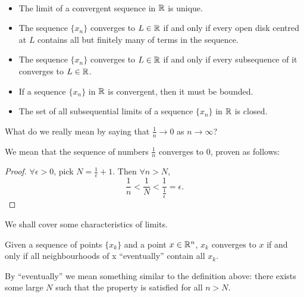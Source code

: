 \begin{proposition} \
\begin{itemize}
\item The limit of a convergent sequence in $\mathbb R$ is unique.
\item The sequence $\{x_n\}$ converges to $L\in\mathbb R$ if and only if every open disk centred at $L$ contains all but finitely many of terms in the sequence.
\item The sequence $\{x_n\}$ converges to $L\in\mathbb R$ if and only if every subsequence of it converges to $L\in\mathbb R$.
\item If a sequence $\{x_n\}$ in $\mathbb R$ is convergent, then it must be bounded.
\item The set of all subsequential limits of a sequence $\{x_n\}$ in $\mathbb R$ is closed.
\end{itemize}
\end{proposition}




\begin{exercise}{}{}
What do we really mean by saying that $\frac{1}{n}\to 0$ as $n\to\infty$?

We mean that the sequence of numbers $\frac{1}{n}$ converges to 0, proven as follows:

\begin{proof}
$\forall\epsilon>0$, pick $N=\frac{1}{\epsilon}+1$. Then $\forall n>N$,
\[ \frac{1}{n} < \frac{1}{N} < \frac{1}{\frac{1}{\epsilon}} = \epsilon. \]
\end{proof}
\end{exercise}

We shall cover some characteristics of limits.

\begin{proposition}
Given a sequence of points $\{x_k\}$ and a point $x\in\mathbb R^n$, $x_k$ converges to $x$ if and only if all neighbourhoods of x ``eventually'' contain all $x_k$.

By ``eventually'' we mean something similar to the definition above: there exists some large $N$ such that the property is satisfied for all $n>N$.
\end{proposition}

